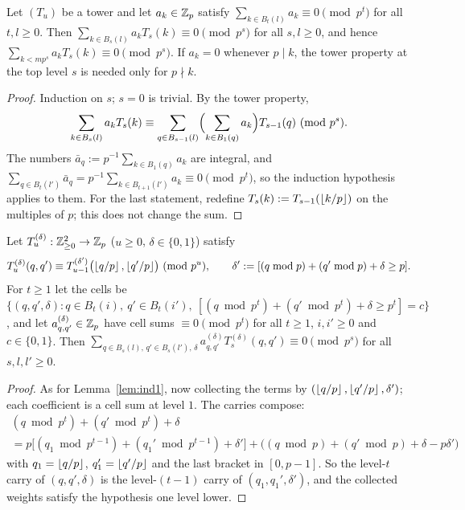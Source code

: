 \documentclass[11pt]{amsart}
\begin{document}
\begin{lemma}\label{lem:ind1}
Let $(T_u)$ be a tower and let $a_k\in\Zp$ satisfy $\sum_{k\in B_t(l)}a_k\equiv0\pmod{p^t}$ for all $t,l\ge0$. Then $\sum_{k\in B_s(l)}a_kT_s(k)\equiv0\pmod{p^s}$ for all $s,l\ge0$, and hence $\sum_{k<mp^s}a_kT_s(k)\equiv0\pmod{p^s}$. If $a_k=0$ whenever $p\mid k$, the tower property at the top level $s$ is needed only for $p\nmid k$.
\end{lemma}
\begin{proof}
Induction on $s$; $s=0$ is trivial. By the tower property,
\[ \sum_{k\in B_s(l)}a_kT_s(k)\equiv\sum_{q\in B_{s-1}(l)}\Bigl(\sum_{k\in B_1(q)}a_k\Bigr)T_{s-1}(q)\pmod{p^s}. \] The numbers $\bar a_q:=p^{-1}\sum_{k\in B_1(q)}a_k$ are integral, and $\sum_{q\in B_t(l')}\bar a_q=p^{-1}\sum_{k\in B_{t+1}(l')}a_k\equiv0\pmod{p^t}$, so the induction hypothesis applies to them. For the last statement, redefine $T_s(k):=T_{s-1}(\fl{k/p})$ on the multiples of $p$; this does not change the sum.
\end{proof}

\begin{lemma}\label{lem:ind2}
Let $T^{(\delta)}_u:\Z_{\ge0}^2\to\Zp$ ($u\ge0$, $\delta\in\{0,1\}$) satisfy
\[ T^{(\delta)}_u(q,q')\equiv T^{(\delta')}_{u-1}\bigl(\fl{q/p},\fl{q'/p}\bigr)\pmod{p^u},\qquad\delta':=[(q\bmod p)+(q'\bmod p)+\delta\ge p]. \]
For $t\ge1$ let the cells be $\{(q,q',\delta):q\in B_t(i),\ q'\in B_t(i'),\ [(q\bmod p^t)+(q'\bmod p^t)+\delta\ge p^t]=c\}$, and let $a^{(\delta)}_{q,q'}\in\Zp$ have cell sums $\equiv0\pmod{p^t}$ for all $t\ge1$, $i,i'\ge0$ and $c\in\{0,1\}$. Then $\sum_{q\in B_s(l),\,q'\in B_s(l'),\,\delta}a^{(\delta)}_{q,q'}T^{(\delta)}_s(q,q')\equiv0\pmod{p^s}$ for all $s,l,l'\ge0$.
\end{lemma}
\begin{proof}
As for Lemma~\ref{lem:ind1}, now collecting the terms by $(\fl{q/p},\fl{q'/p},\delta')$; each coefficient is a cell sum at level $1$. The carries compose:
\begin{multline*} (q\bmod p^t)+(q'\bmod p^t)+\delta\\ =p\bigl[(q_1\bmod p^{t-1})+(q_1'\bmod p^{t-1})+\delta'\bigr]+\bigl((q\bmod p)+(q'\bmod p)+\delta-p\delta'\bigr) \end{multline*}
with $q_1=\fl{q/p}$, $q_1'=\fl{q'/p}$ and the last bracket in $[0,p-1]$. So the level-$t$ carry of $(q,q',\delta)$ is the level-$(t-1)$ carry of $(q_1,q_1',\delta')$, and the collected weights satisfy the hypothesis one level lower.
\end{proof}
\end{document}
